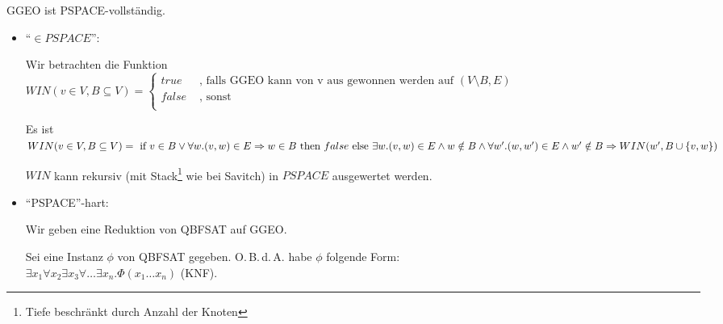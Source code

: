 \begin{satz}

    GGEO ist PSPACE-vollständig.
    
\end{satz}

\begin{beweis}
    
    \begin{itemize}

        \item ``$\in PSPACE$'':

        Wir betrachten die Funktion 
        \\
        $ WIN(v \in V, B \subseteq V) = 
        \begin{cases}
        true         & \text{ , falls GGEO kann von v aus gewonnen werden auf  } (V \setminus B, E)     \\
        false         &  \text{ , sonst }    \\
        \end{cases}
        $

        Es ist $WIN(v \in V, B \subseteq V) = 
        \\\text{ if } v \in B \lor \forall w. (v,w) \in E \Rightarrow w \in B
        \\\text{ then } false
        \\\text{ else } \exists w . (v,w) \in E \land w \notin B \land \forall w' . (w,w') \in E \land w' \notin B \Rightarrow WIN(w', B \cup \{ v,w \})$

        $WIN$ kann rekursiv (mit Stack\footnote{Tiefe beschränkt durch Anzahl der Knoten} wie bei Savitch) in $PSPACE$ ausgewertet werden.




        \item ``PSPACE''-hart:

        Wir geben eine Reduktion von QBFSAT auf GGEO.

        Sei eine Instanz $\phi$ von QBFSAT gegeben. O.\,B.\,d.\,A. habe $\phi$ folgende Form:
        \\
         $\exists x_1 \forall x_2 \exists x_3 \forall \dots \exists x_n . \Phi(x_1 \dots x_n)$ (KNF).


    \end{itemize}

\end{beweis}





